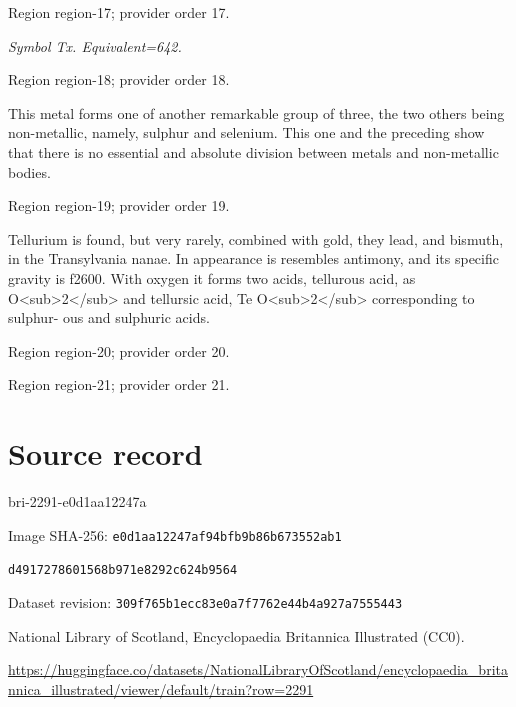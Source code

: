 \documentclass[11pt]{article}
\begin{document}
{\scriptsize\color{gray} Region region-17; provider order 17.\par}
\medskip

{\small\itshape Symbol Tx. Equivalent=642.\par}

{\scriptsize\color{gray} Region region-18; provider order 18.\par}
\medskip

This metal forms one of another remarkable group of three, the two others being non-metallic, namely, sulphur and selenium. This one and the preceding show that there is no essential and absolute division between metals and non-metallic bodies.
\par

{\scriptsize\color{gray} Region region-19; provider order 19.\par}
\medskip

Tellurium is found, but very rarely, combined with gold, they lead, and bismuth, in the Transylvania nanae. In appearance is resembles antimony, and its specific gravity is f2600. With oxygen it forms two acids, tellurous acid, as O<sub>2</sub> and tellursic acid, Te O<sub>2</sub> corresponding to sulphur- ous and sulphuric acids.
\par

{\scriptsize\color{gray} Region region-20; provider order 20.\par}
\medskip


\par

{\scriptsize\color{gray} Region region-21; provider order 21.\par}
\medskip
\newpage\section*{Source record}
bri-2291-e0d1aa12247a\par
Image SHA-256: \texttt{e0d1aa12247af94bfb9b86b673552ab1}\par\texttt{d4917278601568b971e8292c624b9564}\par
Dataset revision: \texttt{309f765b1ecc83e0a7f7}\texttt{762e44b4a927a7555443}\par
National Library of Scotland, Encyclopaedia Britannica Illustrated (CC0).\par
\url{https://huggingface.co/datasets/NationalLibraryOfScotland/encyclopaedia_britannica_illustrated/viewer/default/train?row=2291}
\end{document}
